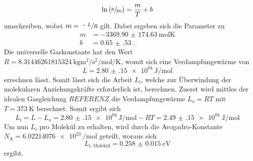 \begin{equation*}
    \ln \left ( \sfrac{p}{p_0} \right) = \frac{m}{T}+b
\end{equation*}
umschreiben, wobei $m=\sfrac{-L}{R}$ gilt.
Dabei ergeben sich die Parameter zu 
\begin{align*}
    m &= \SI{-3369.90(17463)}{\mole\kelvin}\\
    b &= \SI{0.65(53)} \; \text{.}
\end{align*}
Die universelle Gaskonstante hat den Wert $R = \SI{8.31446261815324}{\kilo\gram\metre\squared\per\second\squared\per\mole\per\kelvin}$\cite{gasconstant}, womit sich
eine Verdampfungswärme von 
\begin{equation*}
    L = \SI{2.80(15)e04}{\joule\per\mole}
\end{equation*}
errechnen lässt.
Somit lässt sich die Arbeit $L_\text{i}$, welche zur Überwindung der molekularen Anziehungskräfte erforderlich ist, berechnen.
Zuerst wird mittles der idealen Gasgleichung $REFERENZ$ die Verdampfungswärme $L_\text{a} = RT$ mit $T = \SI{373}{\kelvin}$ berechnet.
Somit ergibt sich 
\begin{equation*}
    L_\text{i} = L - L_\text{a} = \SI{2.80(15)e04}{\joule\per\mole} - RT = \SI{2.49(15)e04}{\joule\per\mole} 
\end{equation*}
Um nun $L_\text{i}$ pro Molekül zu erhalten, wird durch die Avogadro-Konstante $N_\text{A} = \SI{6.02214076e23}{\per\mole}$\cite{avogadro} geteilt,
woraus sich 
\begin{equation*}
    L_\text{i, Molekül} = \SI{0.258(15)}{\electronvolt}
\end{equation*}
ergibt.
